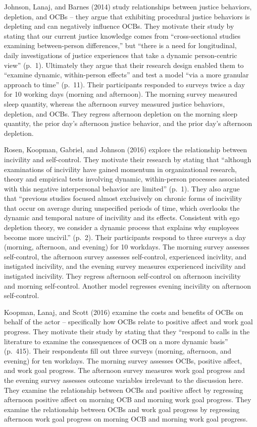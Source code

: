 \documentclass[english,,man]{apa6}
\theoremstyle{definition}
\theoremstyle{definition}
\theoremstyle{definition}
\theoremstyle{remark}
\begin{document}
Johnson, Lanaj, and Barnes (2014) study relationships between justice
behaviors, depletion, and OCBs -- they argue that exhibiting procedural
justice behaviors is depleting and can negatively influence OCBs. They
motivate their study by stating that our current justice knowledge comes
from \enquote{cross-sectional studies examining between-person
differences,} but \enquote{there is a need for longitudinal, daily
investigations of justice experiences that take a dynamic person-centric
view} (p.~1). Ultimately they argue that their research design enabled
them to \enquote{examine dynamic, within-person effects} and test a
model \enquote{via a more granular approach to time} (p.~11). Their
participants responded to surveys twice a day for 10 working days
(morning and afternoon). The morning survey measured sleep quantity,
whereas the afternoon survey measured justice behaviors, depletion, and
OCBs. They regress afternoon depletion on the morning sleep quantity,
the prior day's afternoon justice behavior, and the prior day's
afternoon depletion.

Rosen, Koopman, Gabriel, and Johnson (2016) explore the relationship
between incivility and self-control. They motivate their research by
stating that \enquote{although examinations of incivility have gained
momentum in organizational research, theory and empirical tests
involving dynamic, within-person processes associated with this negative
interpersonal behavior are limited} (p.~1). They also argue that
\enquote{previous studies focused almost exclusively on chronic forms of
incivility that occur on average during unspecified periods of time,
which overlooks the dynamic and temporal nature of incivility and its
effects. Consistent with ego depletion theory, we consider a dynamic
process that explains why employees become more uncivil.} (p.~2). Their
participants respond to three surveys a day (morning, afternoon, and
evening) for 10 workdays. The morning survey assesses self-control, the
afternoon survey assesses self-control, experienced incivlity, and
instigated incivility, and the evening survey measures experienced
incivility and instigated incivility. They regress afternoon
self-control on afternoon incivility and morning self-control. Another
model regresses evening incivility on afternoon self-control.

Koopman, Lanaj, and Scott (2016) examine the costs and benefits of OCBs
on behalf of the actor -- specifically how OCBs relate to positive
affect and work goal progress. They motivate their study by stating that
they \enquote{respond to calls in the literature to examine the
consequences of OCB on a more dynamic basis} (p.~415). Their respondents
fill out three surveys (morning, afternoon, and evening) for ten
workdays. The morning survey assesses OCBs, positive affect, and work
goal progress. The afternoon survey measures work goal progress and the
evening survey assesses outcome variables irrelevant to the discussion
here. They examine the relationship between OCBs and positive affect by
regressing afternoon positive affect on morning OCB and morning work
goal progress. They examine the relationship between OCBs and work goal
progress by regressing afternoon work goal progress on morning OCB and
morning work goal progress.
\end{document}
